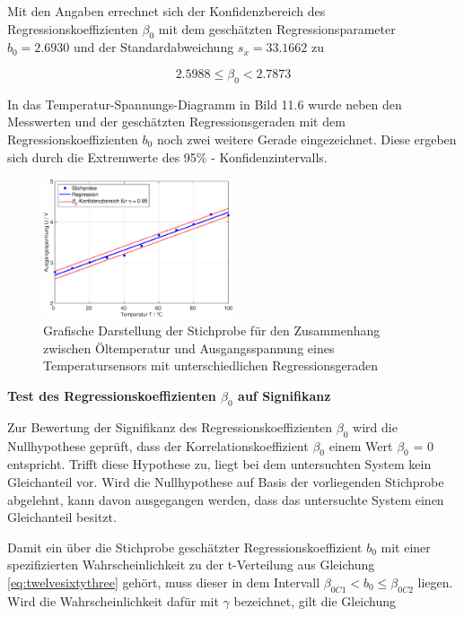 \noindent Mit den Angaben errechnet sich der Konfidenzbereich des Regressionskoeffizienten $\beta_{0}$ mit dem gesch\"{a}tzten Regressionsparameter $b_{0} = 2.6930$ und der Standardabweichung $s_{x} = 33.1662$ zu

\begin{equation}\label{eq:twelveseventyone}
2.5988 \le \beta _{0} <  2.7873
\end{equation}

\noindent In das Temperatur-Spannungs-Diagramm in Bild 11.6 wurde neben den Messwerten und der gesch\"{a}tzten Regressionsgeraden mit dem Regressionskoeffizienten $b_{0}$ noch zwei weitere Gerade eingezeichnet. Diese ergeben sich durch die Extremwerte des 95\% - Konfidenzintervalls.

\noindent 
\begin{figure}[H]
  \centerline{\includegraphics[width=0.5\textwidth]{Kapitel12/Bilder/image7}}
  \caption{Grafische Darstellung der Stichprobe f\"{u}r den Zusammenhang zwischen \"{O}ltemperatur und Ausgangsspannung eines Temperatursensors mit unterschiedlichen Regressionsgeraden}
  \label{fig:RegressionLinearOeltemperatur4}
\end{figure}

\selectfont
\noindent\textbf{Test des Regressionskoeffizienten $\beta_{0}$ auf Signifikanz}\smallskip

\noindent Zur Bewertung der Signifikanz des Regressionskoeffizienten $\beta_{0}$ wird die Nullhypothese gepr\"{u}ft, dass der Korrelationskoeffizient $\beta_{0}$ einem Wert $\beta_{0}$ = 0 entspricht. Trifft diese Hypothese zu, liegt bei dem untersuchten System kein Gleichanteil vor. Wird die Nullhypothese auf Basis der vorliegenden Stichprobe abgelehnt, kann davon ausgegangen werden, dass das untersuchte System einen Gleichanteil besitzt.\newline

\noindent Damit ein \"{u}ber die Stichprobe gesch\"{a}tzter Regressionskoeffizient $b_{0}$ mit einer spezifizierten Wahrscheinlichkeit zu der t-Verteilung aus Gleichung \eqref{eq:twelvesixtythree} geh\"{o}rt, muss dieser in dem Intervall $\beta_{0C1} < b_{0} \leq \beta_{0C2}$ liegen. Wird die Wahrscheinlichkeit daf\"{u}r mit $\gamma$ bezeichnet, gilt die Gleichung

